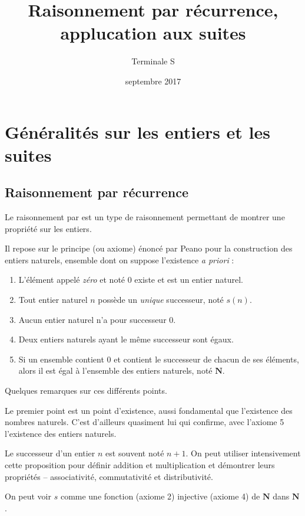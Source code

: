 \documentclass[12pt,a4paper]{article}
\title{Raisonnement par récurrence, applucation aux suites}
\author{Terminale S}
\date{septembre 2017}
\makeatletter
\renewcommand{\maketitle}%
{\framebox{%
    \begin{minipage}{1.0\linewidth}%
      \begin{center}%
        \Large \@title ~-- \@author \\%
        \@date%
      \end{center}%
    \end{minipage}}%
  \normalsize%
}
\newcommand{\N}{\mathbf{N}}
\theoremstyle{break}
\theoremstyle{plain}
\theoremstyle{nonumberplain}
\theoremstyle{nonumberbreak}
\makeatother
\begin{document}
\maketitle

\section{Généralités sur les entiers et les suites}

\subsection{Raisonnement par récurrence}

Le raisonnement par \underline{\hspace{8em}} est un type de raisonnement
permettant de montrer une propriété sur les entiers.

Il repose sur le principe (ou axiome) énoncé par Peano pour la
construction des entiers naturels, ensemble dont on suppose l'existence
\emph{a priori} :
\begin{enumerate}[label=(\roman*)]
  \item L'élément appelé \emph{zéro} et noté 0 existe et est un entier
    naturel.
  \item Tout entier naturel $n$ possède un \emph{unique} successeur,
    noté $s(n)$.
  \item Aucun entier naturel n'a pour successeur 0.
  \item Deux entiers naturels ayant le même successeur sont égaux.
  \item Si un ensemble contient 0 et contient le successeur de chacun de
    ses éléments, alors il est égal à l'ensemble des entiers naturels,
    noté $\N$.
\end{enumerate}

Quelques remarques sur ces différents points.

Le premier point est un point d'existence, aussi fondamental que
l'existence des nombres naturels. C'est d'ailleurs quasiment lui qui
confirme, avec l'axiome 5 l'existence des entiers naturels.

Le successeur d'un entier $n$ est souvent noté $n+1$. On peut utiliser
intensivement cette proposition pour définir addition et multiplication
et démontrer leurs propriétés -- associativité, commutativité et
distributivité.

On peut voir $s$ comme une fonction (axiome 2) injective (axiome 4) de
$\N$ dans $\N$.
\end{document}
